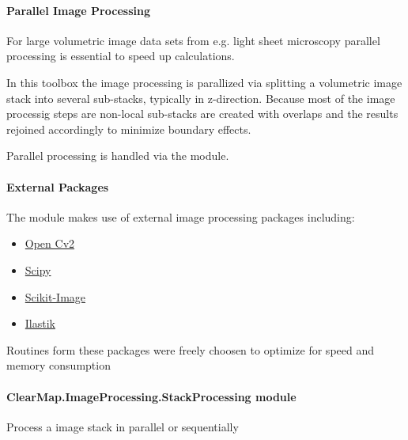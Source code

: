 \documentclass[letterpaper,10pt,english]{sphinxmanual}
\begin{document}
\paragraph{Parallel Image Processing}
\label{api/ClearMap.ImageProcessing:parallel-image-processing}
For large volumetric image data sets from e.g. light sheet microscopy
parallel processing is essential to speed up calculations.

In this toolbox the image processing is parallized via splitting a volumetric
image stack into several sub-stacks, typically in z-direction. Because most of
the image processig steps are non-local sub-stacks are created with overlaps
and the results rejoined accordingly to minimize boundary effects.

Parallel processing is handled via the
{\hyperref[api/ClearMap.ImageProcessing:module-ClearMap.ImageProcessing.StackProcessing]{\emph{}}} module.


\paragraph{External Packages}
\label{api/ClearMap.ImageProcessing:external-packages}
The {\hyperref[api/ClearMap.ImageProcessing:module-ClearMap.ImageProcessing]{\emph{}}} module makes use of external image
processing packages including:
\begin{itemize}
\item {} 
\href{http://opencv.org/}{Open Cv2}

\item {} 
\href{http://www.scipy.org/}{Scipy}

\item {} 
\href{http://scikit-image.org/docs/dev/api/skimage.html}{Scikit-Image}

\item {} 
\href{http://ilastik.org/}{Ilastik}

\end{itemize}

Routines form these packages were freely choosen to optimize for speed and
memory consumption


\paragraph{ClearMap.ImageProcessing.StackProcessing module}
\label{api/ClearMap.ImageProcessing:clearmap-imageprocessing-stackprocessing-module}\label{api/ClearMap.ImageProcessing:module-ClearMap.ImageProcessing.StackProcessing}
Process a image stack in parallel or sequentially
\end{document}
